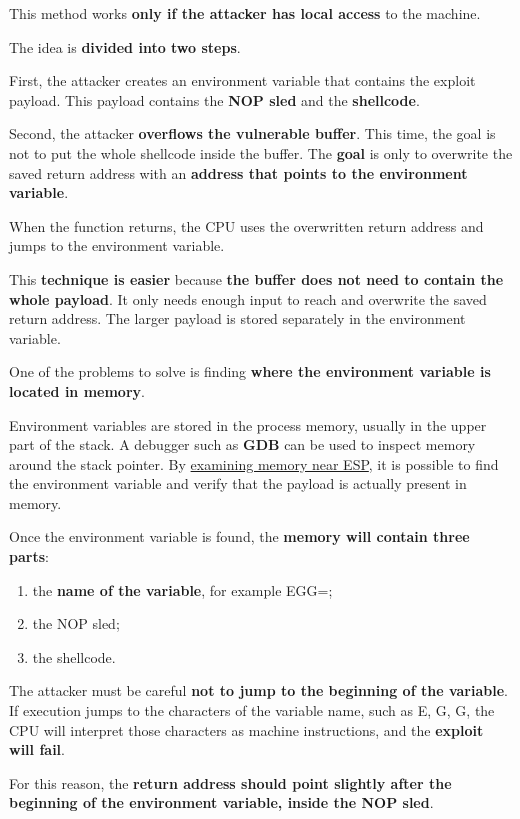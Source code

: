 \documentclass{article}
\begin{document}
This method works \textbf{only if the attacker has local access} to the machine.

The idea is \textbf{divided into two steps}.

First, the attacker creates an environment variable that contains the exploit payload. This payload contains the \textbf{NOP sled} and the \textbf{shellcode}.

Second, the attacker \textbf{overflows the vulnerable buffer}. This time, the goal is not to put the whole shellcode inside the buffer. The \textbf{goal} is only to overwrite the saved return address with an \textbf{address that points to the environment variable}.

When the function returns, the CPU uses the overwritten return address and jumps to the environment variable.

This \textbf{technique is easier} because \textbf{the buffer does not need to contain the whole payload}. It only needs enough input to reach and overwrite the saved return address. The larger payload is stored separately in the environment variable.

One of the problems to solve is finding \textbf{where the environment variable is located in memory}.

Environment variables are stored in the process memory, usually in the upper part of the stack. A debugger such as \textbf{GDB} can be used to inspect memory around the stack pointer. By \underline{examining memory near ESP}, it is possible to find the environment variable and verify that the payload is actually present in memory.

Once the environment variable is found, the \textbf{memory will contain three parts}:

\begin{enumerate}
\item the \textbf{name of the variable}, for example EGG=;
\item the NOP sled;
\item the shellcode.
\end{enumerate}

The attacker must be careful \textbf{not to jump to the beginning of the variable}. If execution jumps to the characters of the variable name, such as E, G, G, the CPU will interpret those characters as machine instructions, and the \textbf{exploit will fail}.

For this reason, the \textbf{return address should point slightly after the beginning of the environment variable, inside the NOP sled}.
\end{document}
